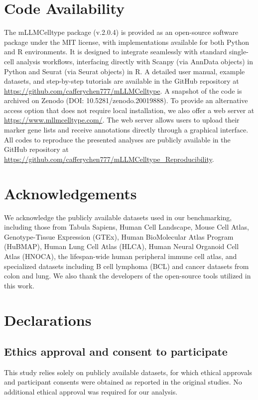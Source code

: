 \documentclass[pdflatex,sn-nature]{sn-jnl}%
\theoremstyle{thmstyleone}%
\theoremstyle{thmstyletwo}%
\theoremstyle{thmstylethree}%
\begin{document}
\section{Code Availability}
The mLLMCelltype package (v.2.0.4) is provided as an open-source software package under the MIT license, with implementations available for both Python and R environments. It is designed to integrate seamlessly with standard single-cell analysis workflows, interfacing directly with Scanpy (via AnnData objects) in Python and Seurat (via Seurat objects) in R. A detailed user manual, example datasets, and step-by-step tutorials are available in the GitHub repository at \url{https://github.com/cafferychen777/mLLMCelltype}. A snapshot of the code is archived on Zenodo (DOI: 10.5281/zenodo.20019888)\cite{yang2025mllmcelltype_zenodo}. To provide an alternative access option that does not require local installation, we also offer a web server at \url{https://www.mllmcelltype.com/}. The web server allows users to upload their marker gene lists and receive annotations directly through a graphical interface. All codes to reproduce the presented analyses are publicly available in the GitHub repository at \url{https://github.com/cafferychen777/mLLMCelltype_Reproducibility}.




\section{Acknowledgements}
We acknowledge the publicly available datasets used in our benchmarking, including those from Tabula Sapiens, Human Cell Landscape, Mouse Cell Atlas, Genotype-Tissue Expression (GTEx), Human BioMolecular Atlas Program (HuBMAP), Human Lung Cell Atlas (HLCA), Human Neural Organoid Cell Atlas (HNOCA), the lifespan-wide human peripheral immune cell atlas, and specialized datasets including B cell lymphoma (BCL) and cancer datasets from colon and lung. We also thank the developers of the open-source tools utilized in this work.

\section{Declarations}

\subsection{Ethics approval and consent to participate}
This study relies solely on publicly available datasets, for which ethical approvals and participant consents were obtained as reported in the original studies. No additional ethical approval was required for our analysis.
\end{document}
